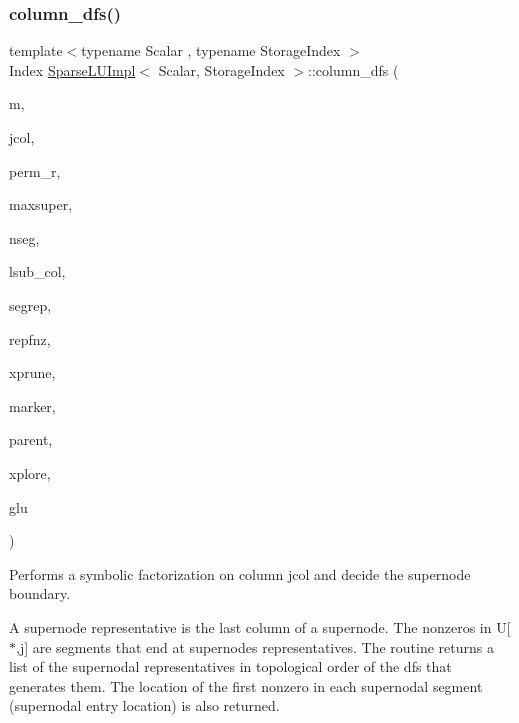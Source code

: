 \subsubsection{\texorpdfstring{column\_dfs()}{column\_dfs()}}
{\footnotesize\ttfamily template$<$typename Scalar , typename Storage\+Index $>$ \\
Index \mbox{\hyperlink{class_eigen_1_1internal_1_1_sparse_l_u_impl}{Sparse\+L\+U\+Impl}}$<$ Scalar, Storage\+Index $>$\+::column\+\_\+dfs (\begin{DoxyParamCaption}\item[{const Index}]{m,  }\item[{const Index}]{jcol,  }\item[{\mbox{\hyperlink{class_eigen_1_1_matrix}{Index\+Vector}} \&}]{perm\+\_\+r,  }\item[{Index}]{maxsuper,  }\item[{Index \&}]{nseg,  }\item[{\mbox{\hyperlink{class_eigen_1_1_ref}{Block\+Index\+Vector}}}]{lsub\+\_\+col,  }\item[{\mbox{\hyperlink{class_eigen_1_1_matrix}{Index\+Vector}} \&}]{segrep,  }\item[{\mbox{\hyperlink{class_eigen_1_1_ref}{Block\+Index\+Vector}}}]{repfnz,  }\item[{\mbox{\hyperlink{class_eigen_1_1_matrix}{Index\+Vector}} \&}]{xprune,  }\item[{\mbox{\hyperlink{class_eigen_1_1_matrix}{Index\+Vector}} \&}]{marker,  }\item[{\mbox{\hyperlink{class_eigen_1_1_matrix}{Index\+Vector}} \&}]{parent,  }\item[{\mbox{\hyperlink{class_eigen_1_1_matrix}{Index\+Vector}} \&}]{xplore,  }\item[{\mbox{\hyperlink{struct_eigen_1_1internal_1_1_l_u___global_l_u__t}{Global\+L\+U\+\_\+t}} \&}]{glu }\end{DoxyParamCaption})\hspace{0.3cm}{\ttfamily [protected]}}



Performs a symbolic factorization on column jcol and decide the supernode boundary. 

A supernode representative is the last column of a supernode. The nonzeros in U\mbox{[}$\ast$,j\mbox{]} are segments that end at supernodes representatives. The routine returns a list of the supernodal representatives in topological order of the dfs that generates them. The location of the first nonzero in each supernodal segment (supernodal entry location) is also returned.


